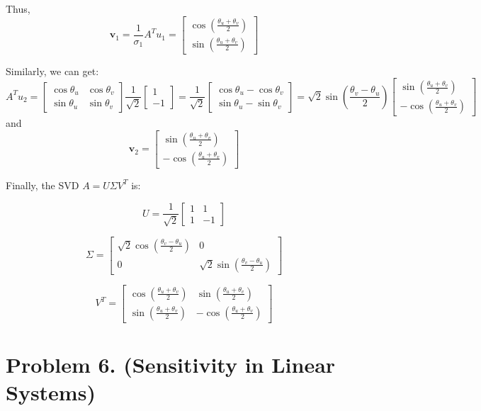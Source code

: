 \documentclass{article}
\newcommand{\0}{{\mathbf{0}}} %
\begin{document}
Thus,
$$\mathbf{v}_1 = \frac{1}{\sigma_1} A^T u_1 =
\begin{bmatrix} \cos\left(\frac{\theta_u+\theta_v}{2}\right) \\ \sin\left(\frac{\theta_u+\theta_v}{2}\right)
\end{bmatrix}$$

Similarly, we can get:
$$A^T u_2
=
\begin{bmatrix} \cos\theta_u & \cos\theta_v \\ \sin\theta_u & \sin\theta_v
\end{bmatrix} \frac{1}{\sqrt{2}}
\begin{bmatrix} 1 \\ -1
\end{bmatrix}
= \frac{1}{\sqrt{2}}
\begin{bmatrix} \cos\theta_u - \cos\theta_v \\ \sin\theta_u - \sin\theta_v
\end{bmatrix}
= \sqrt{2}\sin(\frac{\theta_v - \theta_u}{2})
\begin{bmatrix} \sin(\frac{\theta_u+\theta_v}{2}) \\ -\cos(\frac{\theta_u+\theta_v}{2})
\end{bmatrix}
$$
and
$$\mathbf{v}_2 =
\begin{bmatrix} \sin\left(\frac{\theta_u+\theta_v}{2}\right) \\ -\cos\left(\frac{\theta_u+\theta_v}{2}\right)
\end{bmatrix}$$

Finally, the SVD $A = U \Sigma V^T$ is:

$$U = \frac{1}{\sqrt{2}}
\begin{bmatrix} 1 & 1 \\ 1 & -1
\end{bmatrix}$$

$$\Sigma =
\begin{bmatrix} \sqrt{2}\cos\left(\frac{\theta_v - \theta_u}{2}\right) & 0 \\ 0 & \sqrt{2}\sin\left(\frac{\theta_v - \theta_u}{2}\right)
\end{bmatrix}$$

$$V^T =
\begin{bmatrix} \cos\left(\frac{\theta_u+\theta_v}{2}\right) & \sin\left(\frac{\theta_u+\theta_v}{2}\right) \\ \sin\left(\frac{\theta_u+\theta_v}{2}\right) & -\cos\left(\frac{\theta_u+\theta_v}{2}\right)
\end{bmatrix}$$

\section*{Problem 6. (Sensitivity in Linear Systems)}
\end{document}
